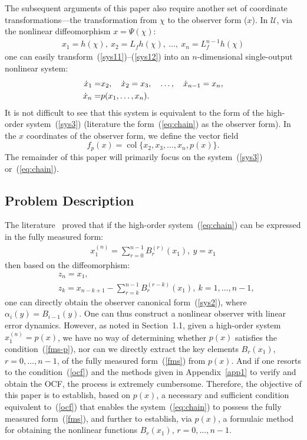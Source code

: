 \documentclass[11pt]{article}
\DeclareMathOperator{\col}{col}
\begin{document}
The subsequent arguments of this paper also require another set of coordinate transformations---the transformation from $\chi$ to the observer form ($x$). In $\mathcal{U}$, via the nonlinear diffeomorphism $x=\Psi(\chi)$:
\begin{align}
	x_1=h(\chi),~x_2=L_fh(\chi),~\ldots,~x_n=L_f^{n-1}h(\chi)\label{observerform-trans}
\end{align} 
one can easily transform~(\ref{sys11})--(\ref{sys12}) into an $n$-dimensional single-output nonlinear system:
\begin{align}\label{eq:chain}
	\dot{x}_1 =& x_2,\quad \dot{x}_2 = x_3,\quad \ldots,\quad \dot{x}_{n-1} = x_n,\notag\\ \dot{x}_n =& p(x_1, \ldots, x_n).
\end{align}
It is not difficult to see that this system is equivalent to the form of the high-order system~(\ref{sys3}) (literature \cite{Krener1985} the form~(\ref{eq:chain}) as the observer form). In the $x$ coordinates of the observer form, we define the vector field
\begin{equation}
	f_p(x) = \col\{x_2, x_3, \ldots, x_n, p(x)\}.
\end{equation}
The remainder of this paper will primarily focus on the system~(\ref{sys3}) or~(\ref{eq:chain}).


\subsection{Problem Description}

The literature~\cite{Duan2020III} proved that if the high-order system~(\ref{eq:chain}) can be expressed in the fully measured form:
\begin{align}
	x_1^{(n)}=\sum_{r=0}^{n-1}B_r^{(r)}(x_1),~y=x_1\label{fms}
\end{align}
then based on the diffeomorphism:
\begin{align}
	&z_n=x_1,\label{transform1}\\
	&z_k=x_{n-k+1}-\sum_{r=k}^{n-1}B_r^{(r-k)}(x_1),~k=1,\ldots,n-1,\label{transform2}
\end{align}
one can directly obtain the observer canonical form~(\ref{sys2}), where $\alpha_i(y)=B_{i-1}(y)$. One can thus construct a nonlinear observer with linear error dynamics. However, as noted in Section~1.1, given a high-order system $x_1^{(n)}=p(x)$, we have no way of determining whether $p(x)$ satisfies the condition~(\ref{fms-p}), nor can we directly extract the key elements $B_r(x_1)$, $r=0,\ldots,n-1$, of the fully measured form~(\ref{fms}) from $p(x)$. And if one resorts to the condition~(\ref{ocf}) and the methods given in Appendix~\ref{app1} to verify and obtain the OCF, the process is extremely cumbersome. Therefore, the objective of this paper is to establish, based on $p(x)$, a necessary and sufficient condition equivalent to~(\ref{ocf}) that enables the system~(\ref{eq:chain}) to possess the fully measured form~(\ref{fms}), and further to establish, via $p(x)$, a formulaic method for obtaining the nonlinear functions $B_r(x_1)$, $r=0,\ldots,n-1$.
\end{document}
